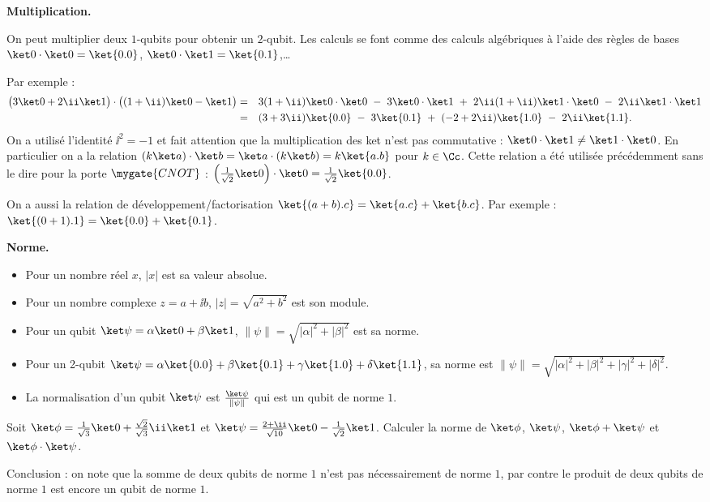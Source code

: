 \documentclass[11pt,class=report,crop=false]{standalone}
\begin{document}
\medskip

\textbf{Multiplication.}

On peut multiplier deux $1$-qubits pour obtenir un $2$-qubit. Les calculs se font comme des calculs algébriques à l'aide des règles de bases $\ket0 \cdot \ket 0 = \ket{0.0}$, $\ket0 \cdot \ket 1 = \ket{0.1}$,\ldots

Par exemple :
\begin{align*}
\big(3\ket0 + 2\ii\ket1\big)\cdot\big((1+\ii)\ket0-\ket1\big)
=\quad&  3(1+\ii)\ket0\cdot\ket0 \   - \  3\ket0\cdot\ket1 \   + \   2\ii(1+\ii)\ket1\cdot\ket0 \   - \  2\ii\ket1\cdot\ket1 \\
=\quad& (3+3\ii)\ket{0.0} \ - \  3\ket{0.1} \   + \   (-2+2\ii)\ket{1.0} \   - \   2\ii\ket{1.1}.
\end{align*}
On a utilisé l'identité $\ii^2 = -1$ et fait attention que la multiplication des \og{}ket\fg{} n'est pas commutative : $\ket0\cdot\ket1 \neq \ket1\cdot\ket0$.
En particulier on a la relation $(k\ket a)\cdot \ket b = \ket a\cdot (k\ket b) = k \ket{a.b}$ pour $k\in \Cc$.
Cette relation a été utilisée précédemment sans le dire pour la porte $\mygate{CNOT}$ :
$\left(\frac1{\sqrt2}\ket0\right)\cdot \ket0 = \frac1{\sqrt2} \ket{0.0}$.

On a aussi la relation de développement/factorisation $\ket{(a+b).c} = \ket{a.c} + \ket{b.c}$. Par exemple : $\ket{(0+1).1} = \ket{0.0}+\ket{0.1}$.


\bigskip
\textbf{Norme.}
\begin{itemize}
  \item Pour un nombre réel $x$,  $|x|$ est sa valeur absolue.
  \item Pour un nombre complexe $z=a+\ii b$, $|z|=\sqrt{a^2+b^2}$ est son module.
  \item Pour un qubit $\ket\psi = \alpha\ket0+\beta\ket1$, $\|\psi\| = \sqrt{|\alpha|^2+|\beta|^2}$ est sa norme.
  \item Pour un 2-qubit $\ket\psi = \alpha\ket{0.0}+\beta\ket{0.1}+\gamma\ket{1.0}+\delta\ket{1.1}$, sa norme est $\|\psi\| = \sqrt{|\alpha|^2+|\beta|^2+|\gamma|^2+|\delta|^2}$.
  \item La normalisation d'un qubit $\ket\psi$ est $\frac{\ket\psi}{\|\psi\|}$ qui  est un qubit de norme $1$.
\end{itemize}

\begin{exercicecours}
Soit $\ket\phi = \frac{1}{\sqrt3}\ket0 +\frac{\sqrt2}{\sqrt3}\ii\ket1$ et $\ket \psi = \frac{2+\ii}{\sqrt{10}}\ket0 - \frac{1}{\sqrt2}\ket1$.
Calculer la norme de $\ket \phi$, $\ket \psi$, $\ket\phi+\ket\psi$ et $\ket\phi\cdot\ket\psi$.

Conclusion : on note que la somme de deux qubits de norme $1$ n'est pas nécessairement de norme $1$, par contre le produit de deux qubits de norme $1$ est encore un qubit de norme $1$.
\end{exercicecours}
\end{document}
